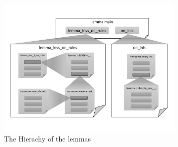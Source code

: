 \documentclass{llncs}
\begin{document}
\begin{figure}[htbp]
\centering %
\includegraphics[width=0.8\textwidth]{thy.pdf}

\caption{The Hierachy of the lemmas\label{fig:lemmaHierachy}
}
\end{figure}
\end{document}
